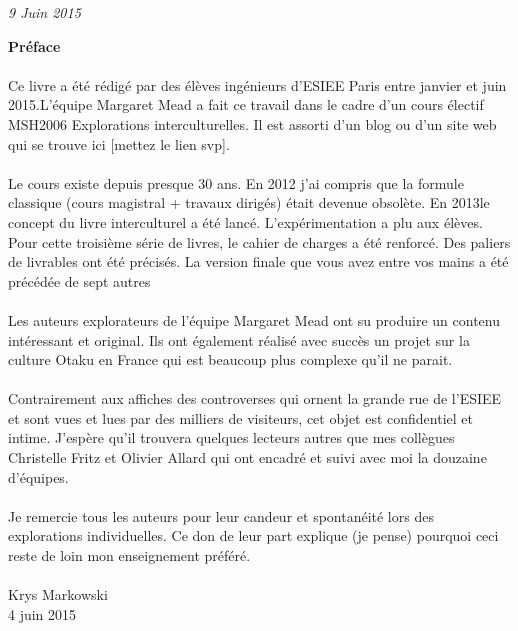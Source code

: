 \documentclass[12pt]{book}
\begin{document}
\begin{titlepage}
\begin{sffamily}
\begin{center}
\begin{minipage}{0.4\textwidth}
\begin{flushright}
				\emph{9 Juin 2015}
      \end{flushright}
    \end{minipage} 
	\end{center}
	\end{sffamily}
\end{titlepage}

\textbf{Préface}

\paragraph{}
Ce livre a été rédigé par des élèves ingénieurs d’ESIEE Paris entre janvier et juin 2015.L’équipe Margaret Mead a fait ce travail dans le cadre d’un cours électif MSH2006 Explorations interculturelles. Il est assorti d’un blog ou d’un site web qui se trouve ici [mettez le lien svp].
\paragraph{}
Le cours existe depuis presque 30 ans.  En 2012 j’ai compris que la formule classique (cours magistral + travaux dirigés) était devenue obsolète.  En 2013le concept du livre interculturel a été lancé.  L’expérimentation a plu aux élèves.  Pour cette troisième série de livres, le cahier de charges a été renforcé. Des paliers de livrables ont été précisés. La version finale que vous avez entre vos mains a été précédée de sept autres
\paragraph{}
Les auteurs explorateurs de l’équipe Margaret Mead ont su produire un contenu intéressant et original. Ils ont également réalisé avec succès un projet sur la culture Otaku en France qui est beaucoup plus complexe qu’il ne parait.
\paragraph{}
Contrairement aux affiches des controverses qui ornent la grande rue de l’ESIEE et sont vues et lues par des milliers de visiteurs, cet objet est confidentiel et intime.  J’espère qu’il trouvera quelques lecteurs autres que mes collègues Christelle Fritz et Olivier Allard qui ont encadré et suivi avec moi la douzaine d’équipes.
\paragraph{}
Je remercie tous les auteurs pour leur candeur et spontanéité lors des explorations individuelles. Ce don de leur part explique (je pense) pourquoi ceci reste de loin mon enseignement préféré.
\paragraph{}
Krys Markowski\\4 juin 2015

\tableofcontents









\end{document}
